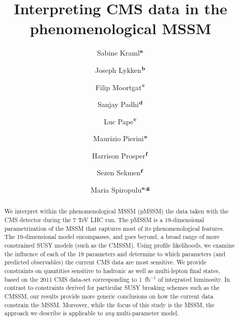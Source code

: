 \documentclass[12pt,aps,preprint,nofootinbib]{revtex4}
\begin{document}

\title{Interpreting CMS data in the phenomenological MSSM}

\author{Sabine Kraml$^{\bf a}$}

\author{Joseph Lykken$^{\bf b}$}

\author{Filip Moortgat$^{\bf c}$}

\author{Sanjay Padhi$^{\bf d}$}

\author{Luc Pape$^{\bf c}$}

\author{Maurizio Pierini$^{\bf e}$}

\author{Harrison Prosper$^{\bf f}$}

\author{Sezen Sekmen$^{\bf f}$}

\author{Maria Spiropulu$^{\bf e,g}$}

\begin{abstract}
We interpret within the phenomenological MSSM (pMSSM) the data taken with the CMS detector during the 7 TeV LHC run.  
The pMSSM is a 19-dimensional parametrization of the MSSM that captures most of 
its phenomenological features. The 19-dimensional model
encompasses, and goes beyond, a broad range of more constrained SUSY models (such as the CMSSM). 
Using profile likelihoods, we examine the influence of each of the 
19 parameters and determine to which parameters 
(and predicted observables) the current CMS data are most sensitive. 
We provide constraints on quantities sensitive to hadronic as well as multi-lepton final states, 
based on the 2011 CMS data-set corresponding to 1~fb$^{-1}$ of integrated luminosity.
In contrast to constraints derived for particular SUSY breaking schemes 
such as the CMSSM, our results provide more generic conclusions on how the current 
data constrain the MSSM. Moreover, while the focus of this study is the 
MSSM, the approach we describe is applicable to \emph{any} multi-parameter model.
\end{abstract}
\end{document}
